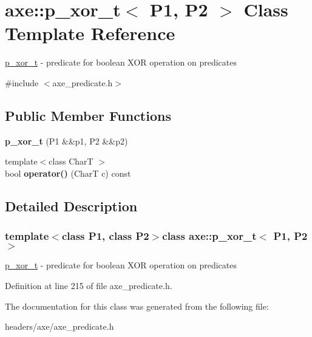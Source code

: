 \hypertarget{classaxe_1_1p__xor__t}{\section{axe\+:\+:p\+\_\+xor\+\_\+t$<$ P1, P2 $>$ Class Template Reference}
\label{classaxe_1_1p__xor__t}
}


\hyperlink{classaxe_1_1p__xor__t}{p\+\_\+xor\+\_\+t} -\/ predicate for boolean X\+O\+R operation on predicates  




{\ttfamily \#include $<$axe\+\_\+predicate.\+h$>$}

\subsection*{Public Member Functions}
\begin{DoxyCompactItemize}
\item 
\hypertarget{classaxe_1_1p__xor__t_a3e5a21042bf03ae12a0f2550545162b9}{{\bfseries p\+\_\+xor\+\_\+t} (P1 \&\&p1, P2 \&\&p2)}\label{classaxe_1_1p__xor__t_a3e5a21042bf03ae12a0f2550545162b9}

\item 
\hypertarget{classaxe_1_1p__xor__t_a6b7d7f98d1e5c1356821e2a3b75d06d8}{{\footnotesize template$<$class Char\+T $>$ }\\bool {\bfseries operator()} (Char\+T c) const }\label{classaxe_1_1p__xor__t_a6b7d7f98d1e5c1356821e2a3b75d06d8}

\end{DoxyCompactItemize}


\subsection{Detailed Description}
\subsubsection*{template$<$class P1, class P2$>$class axe\+::p\+\_\+xor\+\_\+t$<$ P1, P2 $>$}

\hyperlink{classaxe_1_1p__xor__t}{p\+\_\+xor\+\_\+t} -\/ predicate for boolean X\+O\+R operation on predicates 

Definition at line 215 of file axe\+\_\+predicate.\+h.



The documentation for this class was generated from the following file\+:\begin{DoxyCompactItemize}
\item 
headers/axe/axe\+\_\+predicate.\+h\end{DoxyCompactItemize}
